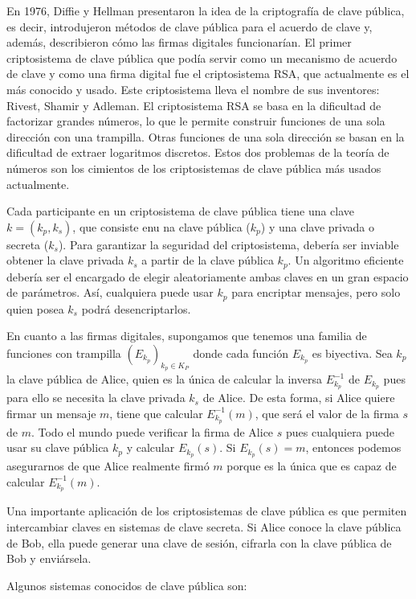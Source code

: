 En 1976, Diffie y Hellman presentaron la idea de la criptografía de clave pública, es decir, introdujeron métodos de clave pública para el acuerdo de clave y, además, describieron cómo las firmas digitales funcionarían. El primer criptosistema de clave pública que podía servir como un mecanismo de acuerdo de clave y como una firma digital fue el criptosistema RSA, que actualmente es el más conocido y usado. Este criptosistema lleva el nombre de sus inventores: Rivest, Shamir y Adleman. El criptosistema RSA se basa en la dificultad de factorizar grandes números, lo que le permite construir funciones de una sola dirección con una trampilla. Otras funciones de una sola dirección se basan en la dificultad de extraer logaritmos discretos. Estos dos problemas de la teoría de números son los cimientos de los criptosistemas de clave pública más usados actualmente.

Cada participante en un criptosistema de clave pública tiene una clave $k = (k_p, k_s)$, que consiste enu na clave pública ($k_p$) y una clave privada o secreta ($k_s$). Para garantizar la seguridad del criptosistema, debería ser inviable obtener la clave privada $k_s$ a partir de la clave pública $k_p$. Un algoritmo eficiente debería ser el encargado de elegir aleatoriamente ambas claves en un gran espacio de parámetros. Así, cualquiera puede usar $k_p$ para encriptar mensajes, pero solo quien posea $k_s$ podrá desencriptarlos.

En cuanto a las firmas digitales, supongamos que tenemos una familia de funciones con trampilla $\left( E_{k_p} \right)_{k_p \in K_P}$ donde cada función $E_{k_p}$ es biyectiva. Sea $k_p$ la clave pública de Alice, quien es la única de calcular la inversa $E_{k_p}^{-1}$ de $E_{k_p}$ pues para ello se necesita la clave privada $k_s$ de Alice. De esta forma, si Alice quiere firmar un mensaje $m$, tiene que calcular $E_{k_p}^{-1}(m)$, que será el valor de la firma $s$ de $m$. Todo el mundo puede verificar la firma de Alice $s$ pues cualquiera puede usar su clave pública $k_p$ y calcular $E_{k_p}(s)$. Si $E_{k_p} (s) = m$, entonces podemos asegurarnos de que Alice realmente firmó $m$ porque es la única que es capaz de calcular $E_{k_p}^{-1}(m)$.

Una importante aplicación de los criptosistemas de clave pública es que permiten intercambiar claves en sistemas de clave secreta. Si Alice conoce la clave pública de Bob, ella puede generar una clave de sesión, cifrarla con la clave pública de Bob y enviársela.  

Algunos sistemas conocidos de clave pública son:

